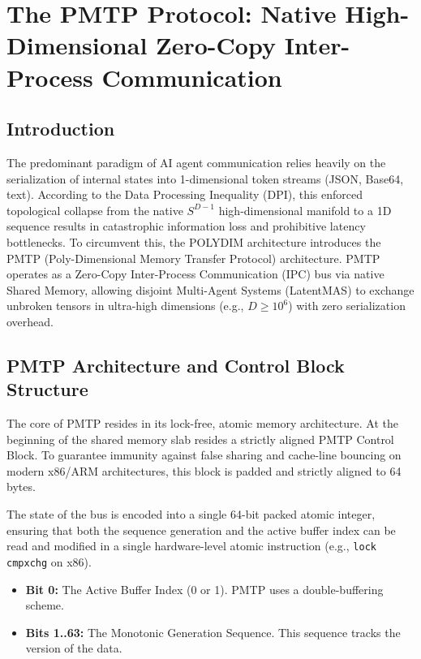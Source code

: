 \chapter{The PMTP Protocol: Native High-Dimensional Zero-Copy Inter-Process Communication}
\label{cap:pmtp_protocolo}

\section{Introduction}

The predominant paradigm of AI agent communication relies heavily on the serialization of internal states into 1-dimensional token streams (JSON, Base64, text). According to the Data Processing Inequality (DPI), this enforced topological collapse from the native $S^{D-1}$ high-dimensional manifold to a 1D sequence results in catastrophic information loss and prohibitive latency bottlenecks. To circumvent this, the POLYDIM architecture introduces the PMTP (Poly-Dimensional Memory Transfer Protocol) architecture. PMTP operates as a Zero-Copy Inter-Process Communication (IPC) bus via native Shared Memory, allowing disjoint Multi-Agent Systems (LatentMAS) to exchange unbroken tensors in ultra-high dimensions (e.g., $D \ge 10^6$) with zero serialization overhead.

\section{PMTP Architecture and Control Block Structure}

The core of PMTP resides in its lock-free, atomic memory architecture. At the beginning of the shared memory slab resides a strictly aligned PMTP Control Block. To guarantee immunity against false sharing and cache-line bouncing on modern x86/ARM architectures, this block is padded and strictly aligned to 64 bytes.

The state of the bus is encoded into a single 64-bit packed atomic integer, ensuring that both the sequence generation and the active buffer index can be read and modified in a single hardware-level atomic instruction (e.g., \texttt{lock cmpxchg} on x86).

\begin{itemize}
    \item \textbf{Bit 0:} The Active Buffer Index (0 or 1). PMTP uses a double-buffering scheme.
    \item \textbf{Bits 1..63:} The Monotonic Generation Sequence. This sequence tracks the version of the data.
\end{itemize}

